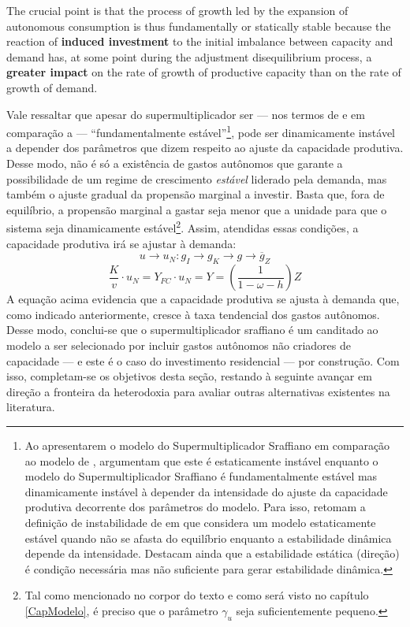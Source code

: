 \begin{citacao}
	The crucial point is that the process of growth led by the expansion of autonomous consumption is thus fundamentally or statically stable because the reaction of \textbf{induced investment} to the initial imbalance between capacity and demand has, at some point during the adjustment disequilibrium process, a \textbf{greater impact} on the rate of growth of productive capacity than on the rate of growth of demand. \cite[p.~19, grifos adicionados]{serrano_trouble_2017}
\end{citacao}

Vale ressaltar que apesar do supermultiplicador ser --- nos termos de \textcite{hicks_capital_1965} e em comparação a \textcite{harrod_essay_1939} --- ``fundamentalmente estável''\footnote{
	Ao apresentarem o modelo do Supermultiplicador Sraffiano em comparação ao modelo de \textcite{harrod_essay_1939}, \textcite{serrano_trouble_2017} argumentam que este é estaticamente instável enquanto o modelo do Supermultiplicador Sraffiano é fundamentalmente estável mas dinamicamente instável à depender da intensidade do ajuste da capacidade produtiva decorrente dos parâmetros do modelo.
	Para isso, retomam a definição de instabilidade de \textcite{hicks_contribution_1972} em que considera um modelo estaticamente estável quando não se afasta do equilíbrio enquanto a estabilidade dinâmica depende da intensidade. Destacam ainda que a estabilidade estática (direção) é condição necessária mas não suficiente para gerar estabilidade dinâmica.
}, pode ser dinamicamente instável a depender dos parâmetros que dizem respeito ao ajuste da capacidade produtiva. Desse modo, não é só a existência de gastos autônomos que garante a possibilidade de um regime de crescimento \textit{estável} liderado pela demanda, mas também o ajuste gradual da propensão marginal a investir. Basta que, fora de equilíbrio, a propensão marginal a gastar seja menor que a unidade para que o sistema seja dinamicamente estável\footnote{Tal como mencionado no corpor do texto e como será visto no capítulo \ref{CapModelo}, é preciso que o parâmetro $\gamma_u$ seja suficientemente pequeno.}. Assim, atendidas essas condições, a capacidade produtiva irá se ajustar à demanda:
$$
u \to u_N : g_I \to g_K \to g \to \overline g_Z
$$
$$
\frac{K}{v}\cdot u_N = Y_{FC}\cdot u_N = Y = \left(\frac{1}{1 - \omega - h}\right)Z
$$
A equação acima evidencia que a capacidade produtiva se ajusta à demanda que, como indicado anteriormente, cresce à taxa tendencial dos gastos autônomos. 
Desse modo, conclui-se que o supermultiplicador sraffiano é um canditado ao modelo a ser selecionado por incluir gastos autônomos não criadores de capacidade --- e este é o caso do investimento residencial --- por construção.
Com isso, completam-se os objetivos desta seção, restando à seguinte avançar em direção a fronteira da heterodoxia para avaliar outras alternativas existentes na literatura.





